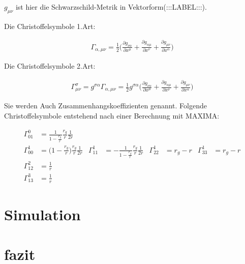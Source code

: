 \begin{refsection}
	$g_{\mu\nu}$ ist hier die Schwarzschild-Metrik in Vektorform(:::LABEL:::).
	
	Die Christoffelsymbole 1.Art:
	
	\begin{align*}
		\Gamma_{\alpha,\mu\nu} 
		= 
		\frac{1}{2}\biggl(\frac{\partial g_{\nu\alpha}}{\partial x^{\mu}} 
		+
		\frac{\partial g_{\alpha\mu}}{\partial x^{\nu}}
		+
		\frac{\partial g_{\mu\nu}}{\partial x^{\alpha}}
		 \biggr)
	\end{align*}
	
	Die Christoffelsymbole 2.Art:
	
	\begin{align*}
	\Gamma^{\sigma}_{\mu\nu} 
	= 
	g^{\sigma\alpha}\Gamma_{\alpha,\mu\nu} 
	=
	\frac{1}{2}g^{\sigma\alpha}\biggl(\frac{\partial g_{\nu\alpha}}{\partial x^{\mu}} 
	+
	\frac{\partial g_{\alpha\mu}}{\partial x^{\nu}}
	+
	\frac{\partial g_{\mu\nu}}{\partial x^{\alpha}}
	\biggr)
	\end{align*}
	
	Sie werden Auch Zusammenhangskoeffizienten genannt.
	Folgende Christoffelsymbole entstehend nach einer Berechnung mit MAXIMA:
	
	\begin{equation}
	\begin{aligned}
	\Gamma^0_{01}
	&=
	\frac{1}{1-\displaystyle\frac{r_g}{r}}
	\frac{r_g}{r}
	\frac{1}{2r}
	\\
	\Gamma^1_{00}
	&=
	\biggl(1-\displaystyle\frac{r_g}{r}\biggr)
	\frac{r_g}{r}
	\frac{1}{2r}
	&
	\Gamma^1_{11}
	&=
	-\frac1{1-\displaystyle\frac{r_g}{r}}
	\frac{r_g}{r}
	\frac{1}{2r}
	&
	\Gamma^1_{22}
	&=
	r_g-r
	&
	\Gamma^1_{33}
	&=
	r_g-r
	\\
	\Gamma^2_{12}
	&=
	\frac1r
	\\
	\Gamma^3_{13}
	&=
	\frac1r
	\end{aligned}
	\end{equation}
		
	\section{Simulation}
	
	
	\section{fazit}
	
	
	


	\printbibliography[heading=subbibliography]
	\end{refsection}

